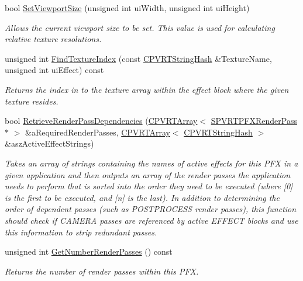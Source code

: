 \begin{DoxyCompactItemize}
bool \hyperlink{class_c_p_v_r_t_p_f_x_parser_a66fee8a0618c11778bad07f1fbe57920}{Set\+Viewport\+Size} (unsigned int ui\+Width, unsigned int ui\+Height)
\begin{DoxyCompactList}\small\item\em Allows the current viewport size to be set. This value is used for calculating relative texture resolutions. \end{DoxyCompactList}\item 
unsigned int \hyperlink{class_c_p_v_r_t_p_f_x_parser_ab0cd310eac907396412ef7989079705a}{Find\+Texture\+Index} (const \hyperlink{class_c_p_v_r_t_string_hash}{C\+P\+V\+R\+T\+String\+Hash} \&Texture\+Name, unsigned int ui\+Effect) const 
\begin{DoxyCompactList}\small\item\em Returns the index in to the texture array within the effect block where the given texture resides. \end{DoxyCompactList}\item 
bool \hyperlink{class_c_p_v_r_t_p_f_x_parser_a50400904966afcd4f0b80b8298762cca}{Retrieve\+Render\+Pass\+Dependencies} (\hyperlink{class_c_p_v_r_t_array}{C\+P\+V\+R\+T\+Array}$<$ \hyperlink{struct_s_p_v_r_t_p_f_x_render_pass}{S\+P\+V\+R\+T\+P\+F\+X\+Render\+Pass} $\ast$ $>$ \&a\+Required\+Render\+Passes, \hyperlink{class_c_p_v_r_t_array}{C\+P\+V\+R\+T\+Array}$<$ \hyperlink{class_c_p_v_r_t_string_hash}{C\+P\+V\+R\+T\+String\+Hash} $>$ \&asz\+Active\+Effect\+Strings)
\begin{DoxyCompactList}\small\item\em Takes an array of strings containing the names of active effects for this P\+F\+X in a given application and then outputs an array of the render passes the application needs to perform that is sorted into the order they need to be executed (where \mbox{[}0\mbox{]} is the first to be executed, and \mbox{[}n\mbox{]} is the last). In addition to determining the order of dependent passes (such as P\+O\+S\+T\+P\+R\+O\+C\+E\+S\+S render passes), this function should check if C\+A\+M\+E\+R\+A passes are referenced by active E\+F\+F\+E\+C\+T blocks and use this information to strip redundant passes. \end{DoxyCompactList}\item 
unsigned int \hyperlink{class_c_p_v_r_t_p_f_x_parser_ace2c1223744f2d11a667317c25db15a8}{Get\+Number\+Render\+Passes} () const 
\begin{DoxyCompactList}\small\item\em Returns the number of render passes within this P\+F\+X. \end{DoxyCompactList}\item 

\end{DoxyCompactItemize}
